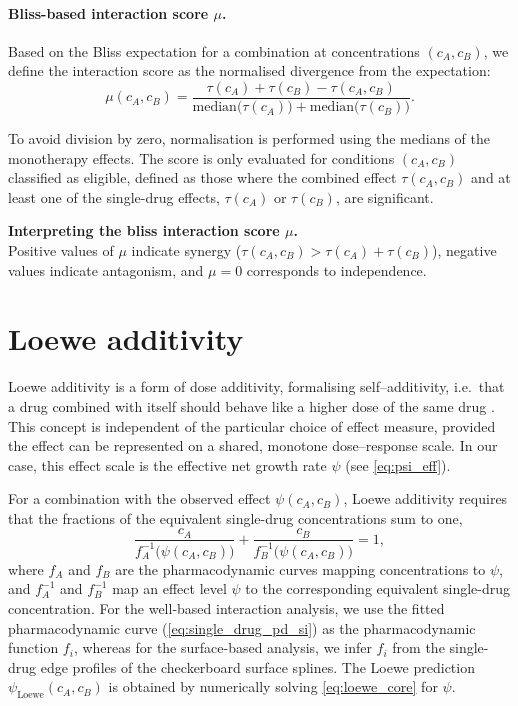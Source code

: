 \paragraph{Bliss-based interaction score \(\mu\).}
Based on the Bliss expectation for a combination at concentrations \((c_A,c_B)\), we define the interaction score as the normalised divergence from the expectation:
\begin{equation}
  \mu(c_A,c_B) =
  \frac{\tau(c_A)+\tau(c_B)-\tau(c_A,c_B)}
  {\mathrm{median}\!\bigl(\tau(c_A)\bigr)+\mathrm{median}\!\bigl(\tau(c_B)\bigr)}.
  \label{eq:mu_si}
\end{equation}

To avoid division by zero, normalisation is performed using the medians of the monotherapy effects.
The score is only evaluated for conditions \((c_A,c_B)\) classified as eligible, defined as those where the combined effect \(\tau(c_A,c_B)\) and at least one of the single-drug effects, \(\tau(c_A)\) or \(\tau(c_B)\), are significant.

\begin{mdframed}[linewidth=0.8pt,backgroundcolor=gray!5,roundcorner=3pt]
  \textbf{Interpreting the bliss interaction score \(\mu\).}\\[3pt]
  Positive values of \(\mu\) indicate synergy (\(\tau(c_A,c_B)>\tau(c_A)+\tau(c_B)\)),
  negative values indicate antagonism, and \(\mu=0\) corresponds to independence.
\end{mdframed}

\section{Loewe additivity}\label{ssec:loewe}
Loewe additivity is a form of dose additivity, formalising self--additivity, i.e.\ that a drug combined with itself should behave like a higher dose of the same drug \cite{Loewe1926}.
This concept is independent of the particular choice of effect measure, provided the effect can be represented on a shared, monotone dose--response scale.
In our case, this effect scale is the effective net growth rate \(\psi\) (see \autoref{eq:psi_eff}).

For a combination with the observed effect \(\psi(c_A,c_B)\), Loewe additivity requires that the fractions of the equivalent single-drug concentrations sum to one,
\begin{equation}
  \frac{c_A}{f_A^{-1}\!\big(\psi(c_A,c_B)\big)} +
  \frac{c_B}{f_B^{-1}\!\big(\psi(c_A,c_B)\big)} = 1,
  \label{eq:loewe_core_si}
\end{equation}
where \(f_A\) and \(f_B\) are the pharmacodynamic curves mapping concentrations to \(\psi\), and \(f_A^{-1}\) and \(f_B^{-1}\) map an effect level \(\psi\) to the corresponding equivalent single-drug concentration.
For the well-based interaction analysis, we use the fitted pharmacodynamic curve (\autoref{eq:single_drug_pd_si}) as the pharmacodynamic function \(f_i\), whereas for the surface-based analysis, we infer \(f_i\) from the single-drug edge profiles of the checkerboard surface splines.
The Loewe prediction \(\psi_{\mathrm{Loewe}}(c_A,c_B)\) is obtained by numerically solving \autoref{eq:loewe_core} for \(\psi\).

